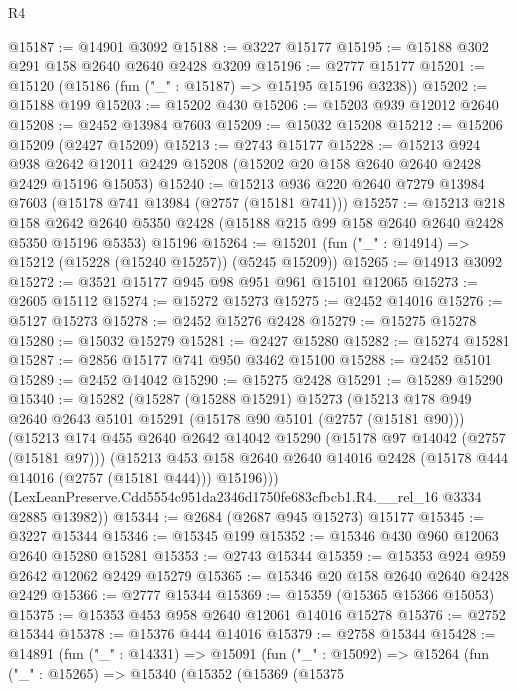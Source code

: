 \begin{lexlean}{R4}
\begin{coremodule}
@15187 := @14901 @3092
@15188 := @3227 @15177
@15195 := @15188 @302 @291 @158 @2640 @2640 @2428 @3209
@15196 := @2777 @15177
@15201 := @15120 (@15186 (fun ("_" : @15187) => @15195 @15196 @3238))
@15202 := @15188 @199
@15203 := @15202 @430
@15206 := @15203 @939 @12012 @2640
@15208 := @2452 @13984 @7603
@15209 := @15032 @15208
@15212 := @15206 @15209 (@2427 @15209)
@15213 := @2743 @15177
@15228 := @15213
    @924
    @938
    @2642
    @12011
    @2429
    @15208
    (@15202 @20 @158 @2640 @2640 @2428 @2429 @15196 @15053)
@15240 := @15213 @936 @220 @2640 @7279 @13984 @7603 (@15178 @741 @13984 (@2757 (@15181 @741)))
@15257 := @15213
    @218
    @158
    @2642
    @2640
    @5350
    @2428
    (@15188 @215 @99 @158 @2640 @2640 @2428 @5350 @15196 @5353)
    @15196
@15264 := @15201 (fun ("_" : @14914) => @15212 (@15228 (@15240 @15257)) (@5245 @15209))
@15265 := @14913 @3092
@15272 := @3521 @15177 @945 @98 @951 @961 @15101 @12065
@15273 := @2605 @15112
@15274 := @15272 @15273
@15275 := @2452 @14016
@15276 := @5127 @15273
@15278 := @2452 @15276 @2428
@15279 := @15275 @15278
@15280 := @15032 @15279
@15281 := @2427 @15280
@15282 := @15274 @15281
@15287 := @2856 @15177 @741 @950 @3462 @15100
@15288 := @2452 @5101
@15289 := @2452 @14042
@15290 := @15275 @2428
@15291 := @15289 @15290
@15340 := @15282
    (@15287
      (@15288 @15291)
      @15273
      (@15213
        @178
        @949
        @2640
        @2643
        @5101
        @15291
        (@15178 @90 @5101 (@2757 (@15181 @90)))
        (@15213
          @174
          @455
          @2640
          @2642
          @14042
          @15290
          (@15178 @97 @14042 (@2757 (@15181 @97)))
          (@15213
            @453
            @158
            @2640
            @2640
            @14016
            @2428
            (@15178 @444 @14016 (@2757 (@15181 @444)))
            @15196)))
      (LexLeanPreserve.Cdd5554c951da2346d1750fe683cfbcb1.R4.__rel_16 @3334 @2885 @13982))
@15344 := @2684 (@2687 @945 @15273) @15177
@15345 := @3227 @15344
@15346 := @15345 @199
@15352 := @15346 @430 @960 @12063 @2640 @15280 @15281
@15353 := @2743 @15344
@15359 := @15353 @924 @959 @2642 @12062 @2429 @15279
@15365 := @15346 @20 @158 @2640 @2640 @2428 @2429
@15366 := @2777 @15344
@15369 := @15359 (@15365 @15366 @15053)
@15375 := @15353 @453 @958 @2640 @12061 @14016 @15278
@15376 := @2752 @15344
@15378 := @15376 @444 @14016
@15379 := @2758 @15344
@15428 := @14891
    (fun ("_" : @14331) =>
    @15091
      (fun ("_" : @15092) =>
      @15264
        (fun ("_" : @15265) =>
        @15340
          (@15352
            (@15369
              (@15375

\end{coremodule}
\end{lexlean}
